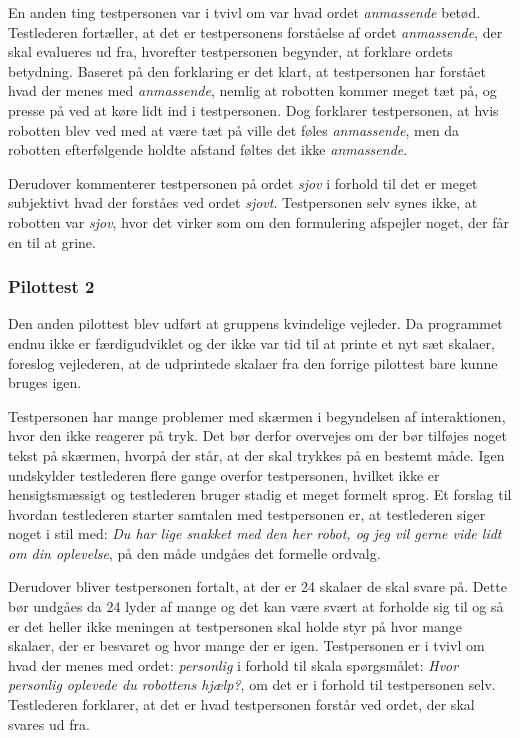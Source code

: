 En anden ting testpersonen var i tvivl om var hvad ordet \textit{anmassende} betød. Testlederen fortæller, at det er testpersonens forståelse af ordet \textit{anmassende}, der skal evalueres ud fra, hvorefter testpersonen begynder, at forklare ordets betydning. Baseret på den forklaring er det klart, at testpersonen har forstået hvad der menes med \textit{anmassende}, nemlig at robotten kommer meget tæt på, og presse på ved at køre lidt ind i testpersonen. Dog forklarer testpersonen, at hvis robotten blev ved med at være tæt på ville det føles \textit{anmassende}, men da robotten efterfølgende holdte afstand føltes det ikke \textit{anmassende}.

Derudover kommenterer testpersonen på ordet \textit{sjov} i forhold til det er meget subjektivt hvad der forståes ved ordet \textit{sjovt}. Testpersonen selv synes ikke, at robotten var \textit{sjov}, hvor det virker som om den formulering afspejler noget, der får en til at grine.

\subsubsection*{Pilottest 2}
\label{TestAfSkalaerPilot2}
%
Den anden pilottest blev udført at gruppens kvindelige vejleder. Da programmet endnu ikke er færdigudviklet og der ikke var tid til at printe et nyt sæt skalaer, foreslog vejlederen, at de udprintede skalaer fra den forrige pilottest bare kunne bruges igen. 

Testpersonen har mange problemer med skærmen i begyndelsen af interaktionen, hvor den ikke reagerer på tryk. Det bør derfor overvejes om der bør tilføjes noget tekst på skærmen, hvorpå der står, at der skal trykkes på en bestemt måde. Igen undskylder testlederen flere gange overfor testpersonen, hvilket ikke er hensigtsmæssigt og testlederen bruger stadig et meget formelt sprog. Et forslag til hvordan testlederen starter samtalen med testpersonen er, at testlederen siger noget i stil med: \textit{Du har lige snakket med den her robot, og jeg vil gerne vide lidt om din oplevelse}, på den måde undgåes det formelle ordvalg. 

Derudover bliver testpersonen fortalt, at der er 24 skalaer de skal svare på. Dette bør undgåes da 24 lyder af mange og det kan være svært at forholde sig til og så er det heller ikke meningen at testpersonen skal holde styr på hvor mange skalaer, der er besvaret og hvor mange der er igen.\blankline     
%
Testpersonen er i tvivl om hvad der menes med ordet: \textit{personlig} i forhold til skala spørgsmålet: \textit{Hvor personlig oplevede du robottens hjælp?}, om det er i forhold til testpersonen selv. Testlederen forklarer, at det er hvad testpersonen forstår ved ordet, der skal svares ud fra.

